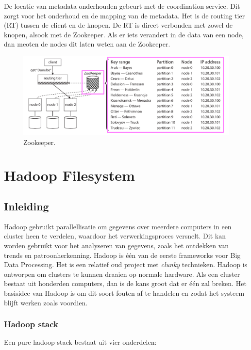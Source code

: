 \documentclass[a4paper,10pt,twoside]{report}
\begin{document}
De locatie van metadata onderhouden gebeurt met de coordination service. Dit zorgt voor het onderhoud en de mapping van de metadata. Het is de routing tier (RT) tussen de client en de knopen. De RT is direct verbonden met zowel de knopen, alsook met de Zookeeper. Als er iets verandert in de data van een node, dan meoten de nodes dit laten weten aan de Zookeeper.

\begin{figure}
	\includegraphics[width=\linewidth]{../images/Screenshot_217.png}
	\caption{Zookeeper.}
\end{figure}

\chapter{Hadoop Filesystem}

\section{Inleiding}

Hadoop gebruikt parallellisatie om gegevens over meerdere computers in een cluster heen te verdelen, waardoor het verwerkingsproces versnelt. Dit kan worden gebruikt voor het analyseren van gegevens, zoals het ontdekken van trends en patroonherkenning. Hadoop is één van de eerste frameworks voor Big Data Processing. Het is een relatief oud project met \textit{clunky} technieken. Hadoop is ontworpen om clusters te kunnen draaien op normale hardware. Als een cluster bestaat uit honderden computers, dan is de kans groot dat er één zal breken. Het basisidee van Hadoop is om dit soort fouten af te handelen en zodat het systeem blijft werken zoals voordien.

\subsection{Hadoop stack}

Een pure hadoop-stack bestaat uit vier onderdelen:
\end{document}
